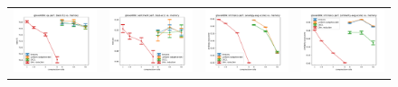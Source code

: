 

\begin{figure}
	\centering
	\begin{tabular}{@{\hskip -0.0in}c@{\hskip -0.0in}c@{\hskip -0.0in}c@{\hskip -0.0in}c@{\hskip -0.0in}}
		\includegraphics[width=.245\linewidth]{figures/glove400k_qa_best-f1_vs_compression.pdf} &
		\includegraphics[width=.245\linewidth]{figures/glove400k_sentiment_trec_test-acc_vs_compression.pdf} &
		\includegraphics[width=.245\linewidth]{figures/glove400k_intrinsics_analogy-avg-score_vs_compression.pdf} &
		\includegraphics[width=.245\linewidth]{figures/glove400k_intrinsics_similarity-avg-score_vs_compression.pdf} \\

\end{tabular}
\end{figure}
